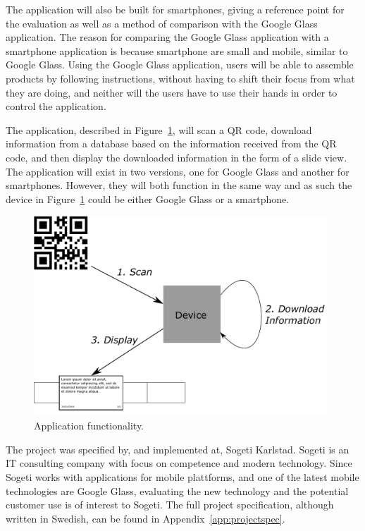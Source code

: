 The application will also be built for smartphones, giving a reference point for the evaluation as well as a method of comparison with the Google Glass application. The reason for comparing the Google Glass application with a smartphone application is because smartphone are small and mobile, similar to Google Glass. Using the Google Glass application, users will be able to assemble products by following instructions, without having to shift their focus from what they are doing, and neither will the users have to use their hands in order to control the application.

The application, described in Figure~\ref{projectmapLightVersion}, will scan a QR code, download information from a database based on the information received from the QR code, and then display the downloaded information in the form of a slide view. The application will exist in two versions, one for Google Glass and another for smartphones. However, they will both function in the same way and as such the device in Figure~\ref{projectmapLightVersion} could be either Google Glass or a smartphone.

	\begin{figure}[ht!]
		\centering
		\includegraphics[width=110mm]{images/projectmapLightVersion}
		\caption{Application functionality.}
		\label{projectmapLightVersion}
	\end{figure}
	
The project was specified by, and implemented at, Sogeti Karlstad. Sogeti is an IT consulting company with focus on competence and modern technology. Since Sogeti works with applications for mobile plattforms, and one of the latest mobile technologies are Google Glass, evaluating the new technology and the potential customer use is of interest to Sogeti. The full project specification, although written in Swedish, can be found in Appendix~\ref{app:projectspec}.

